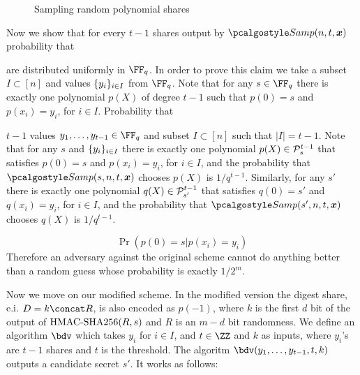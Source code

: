\documentclass[envcountsame,runningheads,notitlepage]{llncs}
\begin{document}
	\begin{figure}
		\centering
		\begin{pcvstack}[boxed]
		\end{pcvstack}
		\caption{Sampling random polynomial shares}
		\label{fig:sample_poly}
	\end{figure}

	Now we show that for every $t - 1$ shares output by $\samplePoly (n, t, \vec{x})$ probability that 
	
	 are distributed uniformly in $\FF_q$. In order to prove this claim we take a subset $I \subset [n]$ and values $\{y_i\}_{i \in I}$ from $\FF_q$. Note that for any $s \in \FF_q$ there is exactly one polynomial $p(X)$ of degree $t - 1$ such that $p(0) = s$ and $p(x_{i}) = y_{i}$, for $i \in I$. Probability that   
	
	$t - 1$ values $y_1, \ldots, y_{t - 1} \in \FF_q$ and subset $I \subset [n]$ such that $|I| = t-1$. Note that for any $s$ and $\{y_i\}_{i \in I}$ there is exactly one polynomial $p(X) \in {\mathcal P}_{s}^{t - 1}$ that satisfies $p(0) = s$ and $p(x_{i}) = y_{i}$, for $i \in I$, and the probability that $\samplePoly(s, n, t, \vec{x})$ chooses $p(X)$ is $1/q^{t-1}$. Similarly, for any $s'$ there is exactly one polynomial $q(X) \in {\mathcal P}_{s'}^{t - 1}$ that satisfies $q(0) = s'$ and $q(x_{i}) = y_{i}$, for $i \in I$, and the probability that $\samplePoly(s', n, t, \vec{x})$ chooses $q(X)$ is $1/q^{t-1}$.


	\[
		\Pr (p(0) = s | p(x_i) = y_i)
	\]
	Therefore an adversary against the original scheme cannot do anything better than a random guess whose probability is exactly $1/2^m$.
	
	Now we move on our modified scheme. 	
	In the modified version the digest share, e.i. $D = k \concat R$, is also encoded as $p(-1)$, where  $k$ is the first $d$ bit of the output of ${\textrm{HMAC-SHA256}}(R, s)$ and $R$ is an $m - d$ bit randomness. 
	We define an algorithm $\bdv$ which takes $y_i$ for $i \in I$, and $t \in \ZZ$ and $k$ as inputs, where $y_i$'s are $t - 1$ shares and $t$ is the threshold.
	The algoritm $\bdv(y_1, \ldots, y_{t-1}, t, k)$ outputs a candidate secret $s'$. It works as follows:
	
\end{document}
